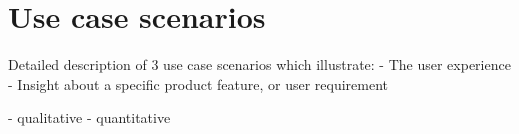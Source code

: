 \section{Use case scenarios}

Detailed description of 3 use case scenarios which illustrate:
- The user experience
- Insight about a specific product feature, or user requirement

- qualitative
- quantitative


